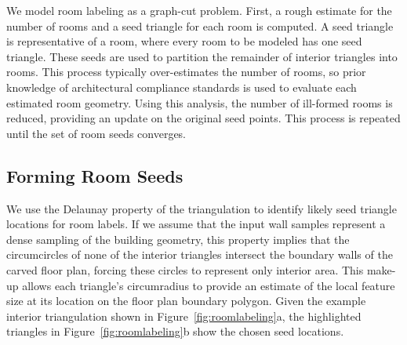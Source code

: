\documentclass[a4paper,twoside]{article}
\begin{document}
We model room labeling as a graph-cut problem.  First, a rough estimate for the number of rooms and a seed triangle for each room is computed.  A seed triangle is representative of a room, where every room to be modeled has one seed triangle.  These seeds are used to partition the remainder of interior triangles into rooms.  This process typically over-estimates the number of rooms, so prior knowledge of architectural compliance standards is used to evaluate each estimated room geometry.  Using this analysis, the number of ill-formed rooms is reduced, providing an update on the original seed points.  This process is repeated until the set of room seeds converges.

\subsection{Forming Room Seeds}
\label{ssec:room_seeds}

We use the Delaunay property of the triangulation to identify likely seed triangle locations for room labels.  If we assume that the input wall samples represent a dense sampling of the building geometry, this property implies that the circumcircles of none of the interior triangles intersect the boundary walls of the carved floor plan, forcing these circles to represent only interior area.  This make-up allows each triangle's circumradius to provide an estimate of the local feature size at its location on the floor plan boundary polygon.  Given the example interior triangulation shown in Figure~\ref{fig:roomlabeling}a, the highlighted triangles in Figure~\ref{fig:roomlabeling}b show the chosen seed locations.
\end{document}
